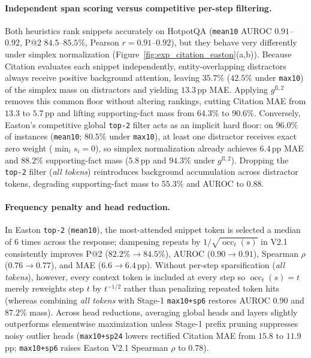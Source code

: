 \paragraph{Independent span scoring versus competitive per-step filtering.}
Both heuristics rank snippets accurately on HotpotQA (\texttt{mean10} AUROC $0.91$--$0.92$, P@2 $84.5$--$85.5\%$, Pearson $r = 0.91$--$0.92$), but they behave very differently under simplex normalization (Figure~\ref{fig:exp_citation_easton}(a,b)). Because Citation evaluates each snippet independently, entity-overlapping distractors always receive positive background attention, leaving $35.7\%$ ($42.5\%$ under \texttt{max10}) of the simplex mass on distractors and yielding $13.3$\,pp MAE. Applying $g^{\text{fl},2}$ removes this common floor without altering rankings, cutting Citation MAE from $13.3$ to $5.7$\,pp and lifting supporting-fact mass from $64.3\%$ to $90.6\%$. Conversely, Easton's competitive global \texttt{top-2} filter acts as an implicit hard floor: on $96.0\%$ of instances (\texttt{mean10}; $80.5\%$ under \texttt{max10}), at least one distractor receives exact zero weight ($\min_i s_i = 0$), so simplex normalization already achieves $6.4$\,pp MAE and $88.2\%$ supporting-fact mass ($5.8$\,pp and $94.3\%$ under $g^{\text{fl},2}$). Dropping the \texttt{top-2} filter (\emph{all tokens}) reintroduces background accumulation across distractor tokens, degrading supporting-fact mass to $55.3\%$ and AUROC to $0.88$.

\paragraph{Frequency penalty and head reduction.}
In Easton \texttt{top-2} (\texttt{mean10}), the most-attended snippet token is selected a median of $6$ times across the response; dampening repeats by $1/\sqrt{\operatorname{occ}_t(s)}$ in V2.1 consistently improves P@2 ($82.2\% \to 84.5\%$), AUROC ($0.90 \to 0.91$), Spearman $\rho$ ($0.76 \to 0.77$), and MAE ($6.6 \to 6.4$\,pp). Without per-step sparsification (\emph{all tokens}), however, every context token is included at every step so $\operatorname{occ}_t(s) = t$ merely reweights step $t$ by $t^{-1/2}$ rather than penalizing repeated token hits (whereas combining \emph{all tokens} with Stage-1 \texttt{max10+sp6} restores AUROC $0.90$ and $87.2\%$ mass). Across head reductions, averaging global heads and layers slightly outperforms elementwise maximization unless Stage-1 prefix pruning suppresses noisy outlier heads (\texttt{max10+sp24} lowers rectified Citation MAE from $15.8$ to $11.9$\,pp; \texttt{max10+sp6} raises Easton V2.1 Spearman $\rho$ to $0.78$).

